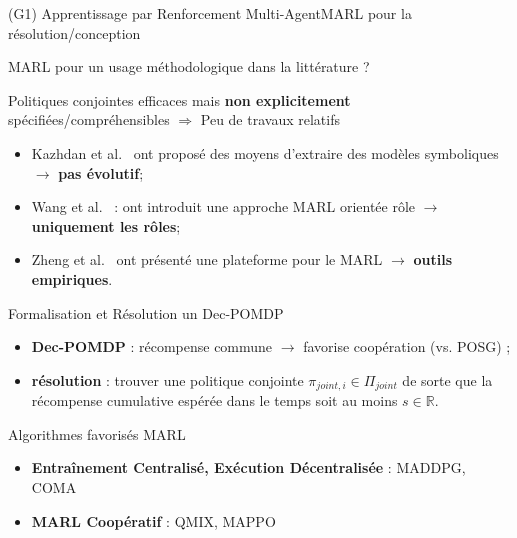 \begin{frame}{(G1) Apprentissage par Renforcement Multi-Agent}{MARL pour la résolution/conception}

    \begin{block}{MARL pour un usage méthodologique dans la littérature ?}

        Politiques conjointes efficaces mais \textbf{non explicitement} spécifiées/compréhensibles
        $\Longrightarrow$ Peu de travaux relatifs
            {\small
                \begin{itemize}
                    \item Kazhdan et al.~\cite{Kazhdan2020} ont proposé des moyens d'extraire des modèles symboliques $\rightarrow$ \textbf{pas évolutif};
                    \item Wang et al.~\cite{Wang2020} : ont introduit une approche MARL orientée rôle $\rightarrow$ \textbf{uniquement les rôles};
                    \item Zheng et al.~\cite{Zheng2018} ont présenté une plateforme pour le MARL $\rightarrow$ \textbf{outils empiriques}.
                \end{itemize}
            }
    \end{block}

    \begin{block}{Formalisation et Résolution un Dec-POMDP}

        \begin{itemize}
            \item \textbf{Dec-POMDP} : récompense commune $\rightarrow$ favorise coopération (vs. POSG) ;
            \item \textbf{résolution} : trouver une politique conjointe $\pi_{joint,i} \in \Pi_{joint}$ de sorte que la récompense cumulative espérée dans le temps soit au moins $s \in \mathbb{R}$.
        \end{itemize}


    \end{block}

    \begin{exampleblock}{Algorithmes favorisés MARL}
        {\footnotesize

            \centering
            \begin{minipage}{0.5\textwidth}
                \centering
                \begin{itemize}
                    \item \textbf{Entraînement Centralisé, Exécution Décentralisée} : MADDPG, COMA
                \end{itemize}
            \end{minipage}\hfill
            \begin{minipage}{0.5\textwidth}
                \centering
                \begin{itemize}
                    \item \textbf{MARL Coopératif} : QMIX, MAPPO
                \end{itemize}
            \end{minipage}\hfill
        }
    \end{exampleblock}

\end{frame}

